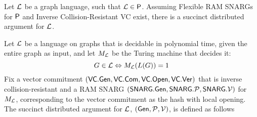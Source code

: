 \begin{theorem}\label{theo:P}
Let $\mathcal{L}$ be a graph language, such that $\mathcal{L}\in {\mathsf{P}}$. Assuming Flexible RAM SNARGs for ${\mathsf{P}}$ and Inverse Collision-Resistant VC exist, there is a succinct distributed argument for $\mathcal{L}$.  
\end{theorem}


Let $\mathcal{L}$ be a language on graphs that is decidable in polynomial time, given the entire graph as input, and let $M_{\mathcal{L}}$ be the Turing machine that decides it:
$$G\in \mathcal{L} \Leftrightarrow M_{\mathcal{L}}(L(G)) = 1$$
Fix a vector commitment $(\mathsf{VC}.\mathsf{Gen}, \mathsf{VC}.\mathsf{Com}, \mathsf{VC}.\mathsf{Open}, \mathsf{VC}.\mathsf{Ver})$ that is inverse collision-resistant and a RAM SNARG $(\mathsf{SNARG}.\mathsf{Gen}, \mathsf{SNARG}.\mathcal{P}, \mathsf{SNARG}.\mathcal{V})$ for $M_{\mathcal{L}}$, corresponding to the vector commitment as the hash with local opening. The succinct distributed argument for $\mathcal{L}$, $(\mathsf{Gen}, \mathcal{P}, \mathcal{V})$, is defined as follows 
